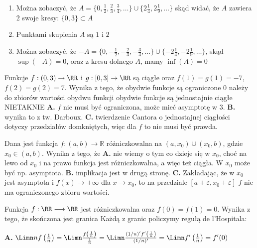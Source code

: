 \begin{solutions}
    \begin{enumerate}[\bf A.]
        \item Można zobaczyć, że $A= \{0, \frac{1}{2}, \frac{2}{3}, \frac{3}{4}, \ldots \}\cup\{2\frac{1}{4}, 2\frac{1}{9}, \ldots\}$ skąd widać, że $A$ zawiera 2 swoje kresy: $\{0, 3\} \subset A$

        \item Punktami skupienia $A$ są $1$ i $2$ 

        \item Można zobaczyć, że $-A= \{0, -\frac{1}{2}, -\frac{2}{3}, -\frac{3}{4}, \ldots \}\cup\{-2\frac{1}{4}, -2\frac{1}{9}, \ldots\}$, skąd $\sup(-A)= 0$, oraz z kresu dolnego $A$, mamy $\inf(A) = 0$
    \end{enumerate}

    
    \sol Funkcje $f : (0, 3) \to \RR$ i $g : [0, 3] \to \RR$ są ciągłe oraz $f(1) = g(1) = -7$, $f(2) = g(2) = 7$. Wynika z tego, że
    \answerss
    {obydwie funkcje są ograniczone}
    {0 należy do zbiorów wartości obydwu funkcji}
    {obydwie funkcje są jednostajnie ciągłe}
    {NIE}{TAK}{NIE}
    \textbf{A.} $f$ nie musi być ograniczona, może mieć asymptotę w $3$. \textbf{B.} wynika to z tw. Darboux. \textbf{C.} twierdzenie Cantora o jednostajnej ciągłości dotyczy przedziałów domkniętych, więc dla $f$ to nie musi być prawda.
    
    \sol Dana jest funkcja $f: (a, b) \to \mathbb{R}$ różniczkowalna na $(a, x_0) \cup (x_0, b)$, gdzie $x_0 \in (a,b)$. Wynika z tego, że
    \textbf{A.} nie wiemy o tym co dzieje się w $x_0$, choć na lewo od $x_0$ i na prawo funkcja jest różniczkowalna, a więc też ciągła. W $x_0$ może być np. asymptota. \textbf{B.} implikacja jest w drugą stronę. \textbf{C.} Zakładając, że w $x_0$ jest asymptota i $f(x) \to +\infty$ dla $x\to x_0$, to na przedziale $[a+\varepsilon, x_0 + \varepsilon]$ $f$ nie ma ograniczonego zbioru wartości. 
    
    \sol Funkcja $f:\RR\longrightarrow\RR$ jest różniczkowalna oraz $f(0)=f(1)=0$. Wynika z tego, że skończona jest granica
    Każdą z granic policzymy regułą de l'Hospitala:
    
    \textbf{A.} $\Limn nf\left(\frac{1}{n}\right) = \Limn \frac{f\left(\frac{1}{n}\right)}{\frac{1}{n}} = \Limn \frac{(1/n)'f'\left(\frac{1}{n}\right)}{(1/n)'} = \Limn f'\left(\frac{1}{n}\right) = f'(0)$
    

\end{solutions}
